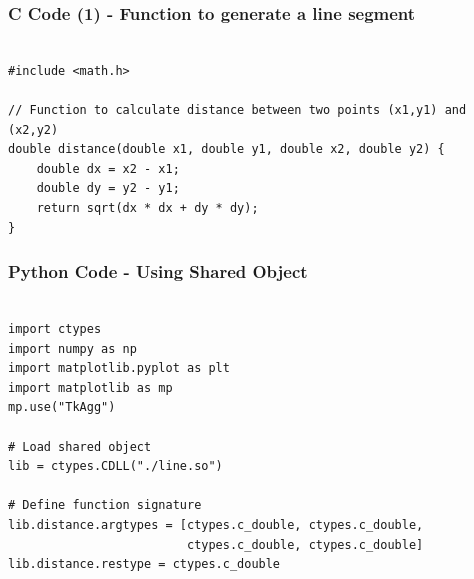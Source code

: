 \documentclass{beamer}
\begin{document}
\begin{frame}[fragile]
    \frametitle{C Code (1) - Function to generate a line segment }

    \begin{lstlisting}

#include <math.h>

// Function to calculate distance between two points (x1,y1) and (x2,y2)
double distance(double x1, double y1, double x2, double y2) {
    double dx = x2 - x1;
    double dy = y2 - y1;
    return sqrt(dx * dx + dy * dy);
}

    \end{lstlisting}
\end{frame}


\begin{frame}[fragile]
    \frametitle{Python Code - Using Shared Object}
    \begin{lstlisting}

import ctypes
import numpy as np
import matplotlib.pyplot as plt
import matplotlib as mp
mp.use("TkAgg")

# Load shared object
lib = ctypes.CDLL("./line.so")

# Define function signature
lib.distance.argtypes = [ctypes.c_double, ctypes.c_double,
                         ctypes.c_double, ctypes.c_double]
lib.distance.restype = ctypes.c_double

   



\end{lstlisting}
\end{frame}
\end{document}
